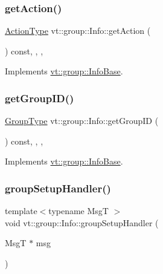 \subsubsection{\texorpdfstring{get\+Action()}{getAction()}}
{\footnotesize\ttfamily \hyperlink{namespacevt_ae0a5a7b18cc99d7b732cb4d44f46b0f3}{Action\+Type} vt\+::group\+::\+Info\+::get\+Action (\begin{DoxyParamCaption}{ }\end{DoxyParamCaption}) const\hspace{0.3cm}{\ttfamily [inline]}, {\ttfamily [override]}, {\ttfamily [protected]}, {\ttfamily [virtual]}}



Implements \hyperlink{structvt_1_1group_1_1_info_base_a643adfea212db8b896b201832bed0445}{vt\+::group\+::\+Info\+Base}.

\mbox{\label{structvt_1_1group_1_1_info_a09fcb16e74a5ae3043859ae70b5b57a9}} 
\subsubsection{\texorpdfstring{get\+Group\+I\+D()}{getGroupID()}}
{\footnotesize\ttfamily \hyperlink{namespacevt_a27b5e4411c9b6140c49100e050e2f743}{Group\+Type} vt\+::group\+::\+Info\+::get\+Group\+ID (\begin{DoxyParamCaption}{ }\end{DoxyParamCaption}) const\hspace{0.3cm}{\ttfamily [inline]}, {\ttfamily [override]}, {\ttfamily [protected]}, {\ttfamily [virtual]}}



Implements \hyperlink{structvt_1_1group_1_1_info_base_afbb8a9919c924c50be2b99e2dc7cbca2}{vt\+::group\+::\+Info\+Base}.

\mbox{\label{structvt_1_1group_1_1_info_a8479ae53fed60033acca267e0918aa6f}} 
\subsubsection{\texorpdfstring{group\+Setup\+Handler()}{groupSetupHandler()}}
{\footnotesize\ttfamily template$<$typename MsgT $>$ \\
void vt\+::group\+::\+Info\+::group\+Setup\+Handler (\begin{DoxyParamCaption}\item[{MsgT $\ast$}]{msg }\end{DoxyParamCaption})\hspace{0.3cm}{\ttfamily [static]}}

